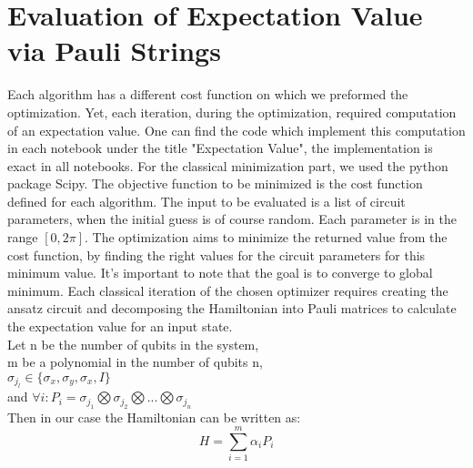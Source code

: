 \documentclass[12pt, a4paper]{article}
\begin{document}
    \section{Evaluation of Expectation Value via Pauli Strings}
    Each algorithm has a different cost function on which we preformed the optimization. Yet, each iteration, during the optimization, required computation of an expectation value.
    One can find the code which implement this computation in each notebook under the title "Expectation Value", the implementation is exact in all notebooks.
    For the classical minimization part, we used the python package Scipy. The objective function to be minimized is the cost function defined for each algorithm. The input to be evaluated is a list of circuit parameters, when the initial guess is of course random. Each parameter is in the range $[0, 2\pi]$. The optimization aims to minimize the returned value from the cost function, by finding the right values for the circuit parameters for this minimum value. It's important to note that the goal is to converge to global minimum.
    Each classical iteration of the chosen optimizer requires creating the ansatz circuit and decomposing the Hamiltonian into Pauli matrices to calculate the expectation value for an input state.\\
    Let n be the number of qubits in the system,\\
    m be a polynomial in the number of qubits n,\\
    $\sigma_{j_l} \in \{ \sigma_x , \sigma_y , \sigma_x , I \}$\\
    and $\forall i: P_i = \sigma_{j_1}  \bigotimes \sigma_{j_2} \bigotimes ... \bigotimes \sigma_{j_n}$\\
    Then in our case the Hamiltonian can be written as:
    \begin{equation}
        H = \sum_{i=1}^m{\alpha_i}P_i
    \end{equation}
\end{document}
